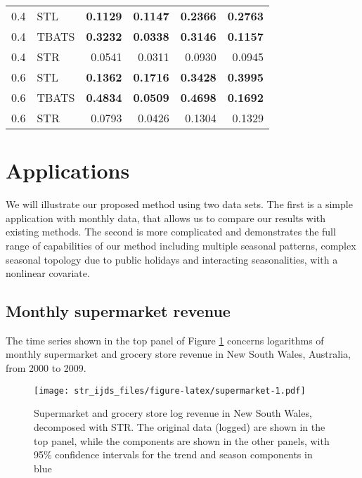 \documentclass[11pt,a4paper,]{article}
\begin{document}
\begin{table}[!ht]
\begin{tabular}[t]{rlrrrr}
\midrule
\hspace{1em}0.4 & STL & \textbf{0.1129} & \textbf{0.1147} & \textbf{0.2366} & \textbf{0.2763}\\
\hspace{1em}0.4 & TBATS & \textbf{0.3232} & \textbf{0.0338} & \textbf{0.3146} & \textbf{0.1157}\\
\hspace{1em}0.4 & STR & 0.0541 & 0.0311 & 0.0930 & 0.0945\\
\midrule
\hspace{1em}0.6 & STL & \textbf{0.1362} & \textbf{0.1716} & \textbf{0.3428} & \textbf{0.3995}\\
\hspace{1em}0.6 & TBATS & \textbf{0.4834} & \textbf{0.0509} & \textbf{0.4698} & \textbf{0.1692}\\
\hspace{1em}0.6 & STR & 0.0793 & 0.0426 & 0.1304 & 0.1329\\
\bottomrule
\end{tabular}
\end{table}

\hypertarget{applications}{%
\section{Applications}\label{applications}}

We will illustrate our proposed method using two data sets. The first is a simple application with monthly data, that allows us to compare our results with existing methods. The second is more complicated and demonstrates the full range of capabilities of our method including multiple seasonal patterns, complex seasonal topology due to public holidays and interacting seasonalities, with a nonlinear covariate.

\hypertarget{ssec:simple}{%
\subsection{Monthly supermarket revenue}\label{ssec:simple}}

The time series shown in the top panel of Figure \ref{fig:supermarket} concerns logarithms of monthly supermarket and grocery store revenue in New South Wales, Australia, from 2000 to 2009.

\begin{figure}
\centering
\texttt{[image: str\_ijds\_files/figure-latex/supermarket-1.pdf]}
\caption{\label{fig:supermarket}Supermarket and grocery store log revenue in New South Wales, decomposed with STR. The original data (logged) are shown in the top panel, while the components are shown in the other panels, with 95\% confidence intervals for the trend and season components in blue}
\end{figure}
\end{document}
